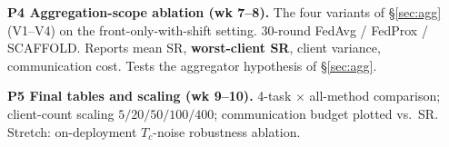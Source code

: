 \documentclass{article}
\begin{document}
\textbf{P4 Aggregation-scope ablation (wk 7--8).} The four
variants of \S\ref{sec:agg} (V1--V4) on the
front-only-with-shift setting. 30-round FedAvg / FedProx /
SCAFFOLD. Reports mean SR, \textbf{worst-client SR}, client
variance, communication cost. Tests the aggregator hypothesis of
\S\ref{sec:agg}.

\textbf{P5 Final tables and scaling (wk 9--10).} 4-task $\times$
all-method comparison; client-count scaling
$5/20/50/100/400$; communication budget plotted vs.\ SR. Stretch:
on-deployment $T_c$-noise robustness ablation.

{\footnotesize
\setlength{\bibsep}{0pt plus 0.3ex}


}
\end{document}
